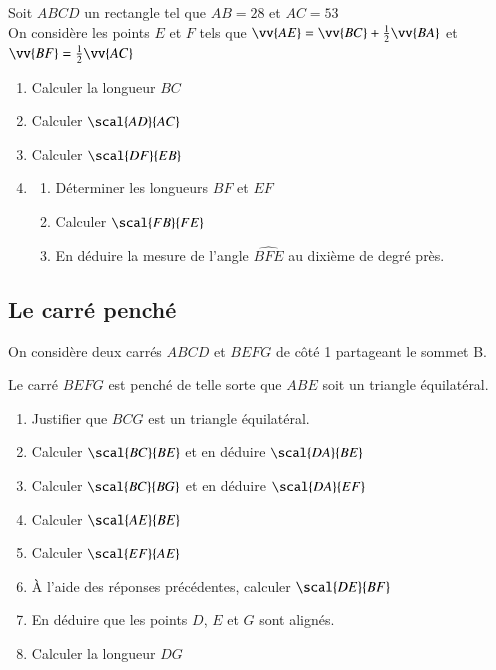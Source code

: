 \documentclass[oneside,12pt]{article}          %
\begin{document}
Soit $ABCD$ un rectangle tel que $AB=28$ et $AC=53$ \\
On considère les points $E$ et $F$ tels que $\vv{AE}=\vv{BC}+\frac{1}{2}\vv{BA}$ et $\vv{BF}=\frac{1}{2}\vv{AC}$
\begin{enumerate}
	\item Calculer la longueur $BC$
    \item Calculer $\scal{AD}{AC}$
    \item Calculer $\scal{DF}{EB}$
    \item \begin{enumerate}
    	\item Déterminer les longueurs $BF$ et $EF$
    	\item Calculer $\scal{FB}{FE}$
    	\item En déduire la mesure de l'angle $\widehat{BFE}$ au dixième de degré près.
    \end{enumerate}
\end{enumerate}



\subsection{Le carré penché}

    On considère deux carrés $ABCD$ et $BEFG$ de côté 1 partageant le sommet B.

    Le carré $BEFG$ est penché de telle sorte que $ABE$ soit un triangle équilatéral.
    
\begin{minipage}{0.5\linewidth}
\begin{enumerate}
    \item Justifier que $BCG$ est un triangle équilatéral.
    \item Calculer $\scal{BC}{BE}$ et en déduire $\scal{DA}{BE}$
    \item Calculer $\scal{BC}{BG}$ et en déduire $\scal{DA}{EF}$
    \item Calculer $\scal{AE}{BE}$
    \item Calculer $\scal{EF}{AE}$
    \item À l'aide des réponses précédentes, calculer $\scal{DE}{BF}$
    \item En déduire que les points $D$, $E$ et $G$ sont alignés.
    \item Calculer la longueur $DG$
\end{enumerate}
\end{minipage}
\hfill
\begin{minipage}{0.4\linewidth}
\end{minipage}
\end{document}
